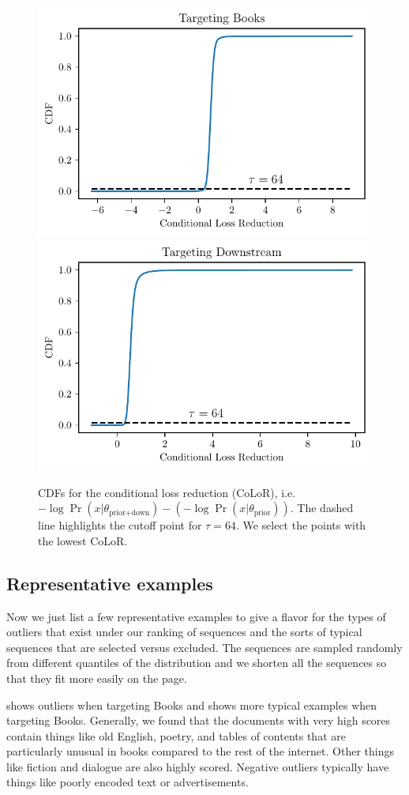 \documentclass{article}
\newcommand{\thetaprior}{\theta_{\text{prior}}}
\newcommand{\thetapriordown}{\theta_{\text{prior}+ \text{down}}}
\begin{document}
\begin{figure}[h]
    \centering
    \includegraphics[height=0.31\textwidth]{images/books_cdf.pdf}
    \hspace{1cm}
    \includegraphics[height=0.31\textwidth]{images/down_cdf.pdf}
    \caption{CDFs for the conditional loss reduction (CoLoR), i.e. $ -\log \Pr(x|\thetapriordown) - (-\log \Pr(x|\thetaprior))$. The dashed line highlights the cutoff point for $ \tau = 64$. We select the points with the lowest CoLoR.}
    \label{fig:cdfs}
\end{figure}


\subsection{Representative examples}

Now we just list a few representative examples to give a flavor for the types of outliers that exist under our ranking of sequences and the sorts of typical sequences that are selected versus excluded. The sequences are sampled randomly from different quantiles of the distribution and we shorten all the sequences so that they fit more easily on the page. 

 shows outliers when targeting Books and  shows more typical examples when targeting Books. Generally, we found that the documents with very high scores contain things like old English, poetry, and tables of contents that are particularly unusual in books compared to the rest of the internet. Other things like fiction and dialogue are also highly scored. Negative outliers typically have things like poorly encoded text or advertisements.
\end{document}
